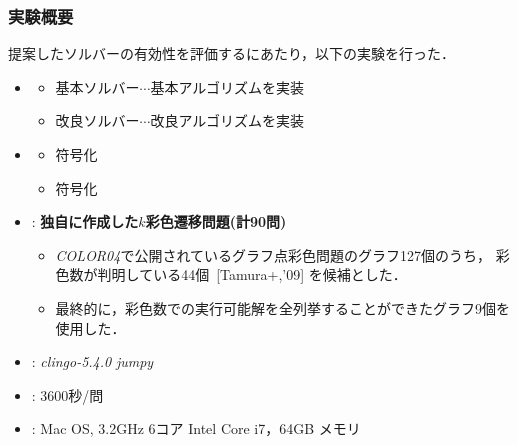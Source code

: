\documentclass[dvipdfmx,11pt]{beamer}
\begin{document}
\begin{frame}\frametitle{実験概要}
  \begin{block}{}\centering
    提案したソルバーの有効性を評価するにあたり，以下の実験を行った．
  \end{block}
  \bigskip
  \begin{itemize}
  \item {}
    \begin{itemize}
    \item 基本ソルバー$\cdots$基本アルゴリズムを実装
    \item 改良ソルバー$\cdots$改良アルゴリズムを実装
    \end{itemize}
  \item {}
    \begin{itemize}
    \item {}符号化
    \item {}符号化
    \end{itemize}
  \item {}: \alert{\bf 独自に作成した$k$彩色遷移問題(計90問)}
    \begin{itemize}
    \item \textit{COLOR04}で公開されているグラフ点彩色問題のグラフ127個のうち，
      彩色数が判明している44個~[Tamura+,'09] を候補とした．
    \item 最終的に，彩色数での実行可能解を全列挙することができたグラフ9個を使用した．
    \end{itemize}
    \item {}: \textit{clingo-5.4.0} \textit{jumpy}
    \item {}: 3600秒/問
    \item {}: Mac OS, 3.2GHz 6コア Intel Core i7，64GB メモリ
    \end{itemize}
\end{frame}
\end{document}
